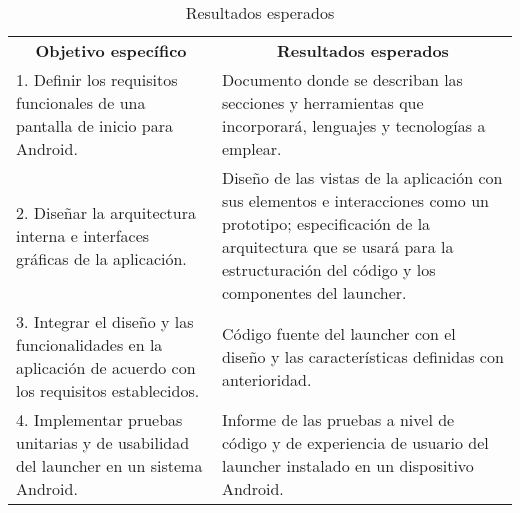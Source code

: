 \begin{table}[H]
\caption{Resultados esperados}
\begin{tabular*}{\textwidth}{|p{}|p{}|}
\cline{1-2}
\multicolumn{1}{|c|}{\cellcolor[gray]{0.9} \textbf{Objetivo específico}} &  \multicolumn{1}{|c|}{\cellcolor[gray]{0.9} \textbf{Resultados esperados}}  \\
\cline{1-2}
1. Definir los requisitos funcionales de una pantalla de inicio para Android. & 
Documento donde se describan las secciones y herramientas que incorporará, lenguajes y tecnologías a emplear.
\\
\cline{1-2} 

2. Diseñar la arquitectura interna e interfaces gráficas de la aplicación. & 
Diseño de las vistas de la aplicación con sus elementos e interacciones como un prototipo; especificación de la arquitectura que se usará para la estructuración del código y los componentes del launcher.
\\

\cline{1-2} 

3. Integrar el diseño y las funcionalidades en la aplicación de acuerdo con los requisitos establecidos. & 
Código fuente del launcher con el diseño y las características definidas con anterioridad. \\

\cline{1-2} 

4. Implementar pruebas unitarias y de usabilidad del launcher en un sistema Android. & 
Informe de las pruebas a nivel de código y de experiencia de usuario del launcher instalado en un dispositivo Android. \\

\cline{1-2} 

\end{tabular*}
\end{table}





